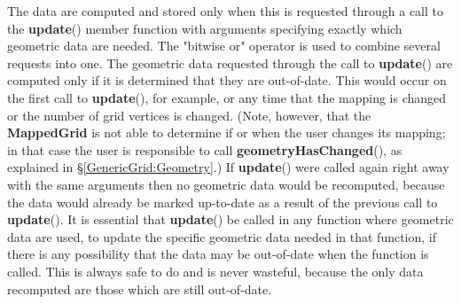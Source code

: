 \documentclass{article}
\begin{document}
The data are computed and stored only when this is requested through a call to the \textbf{update}() member function with
arguments specifying exactly which geometric data are needed.  The "bitwise or" operator is used to combine several requests
into one.  The geometric data requested through the call to \textbf{update}() are computed only if it is determined that
they are out-of-date.  This would occur on the first call to \textbf{update}(), for example, or any time that the mapping
is changed or the number of grid vertices is changed.  (Note, however, that the \textbf{MappedGrid} is not able to determine
if or when the user changes its mapping; in that case the user is responsible to call \textbf{geometryHasChanged}(), as
explained in \S\ref{GenericGrid:Geometry}.)  If \textbf{update}() were called again right away with the same arguments
then no geometric data would be recomputed, because the data would already be marked up-to-date as a result of the previous
call to \textbf{update}().  It is essential that \textbf{update}() be called in any function where geometric data are
used, to update the specific geometric data needed in that function, if there is any possibility that the data may be
out-of-date when the function is called.  This is always safe to do and is never wasteful, because the only data recomputed
are those which are still out-of-date.
\end{document}
